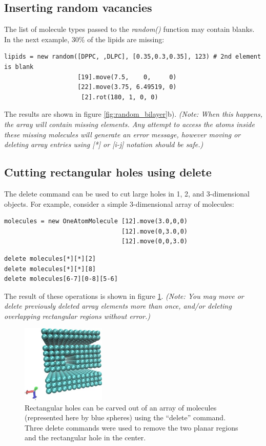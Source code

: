 \documentclass[11pt]{article}
\begin{document}
\subsection{Inserting random vacancies}
\label{sec:random_vacancies}
The list of molecule types passed to the \mbox{\textit{random()}} function
may contain blanks.  In the next example, 30\% of the lipids are missing:
\begin{verbatim}
lipids = new random([DPPC, ,DLPC], [0.35,0.3,0.35], 123) # 2nd element is blank
                    [19].move(7.5,    0,     0)
                    [22].move(3.75, 6.49519, 0)
                     [2].rot(180, 1, 0, 0)     
\end{verbatim}
The results are shown in figure \ref{fig:random_bilayer}b).
\textit{(Note: When this happens, the array will contain missing elements.
 Any attempt to access the atoms inside these missing molecules will
 generate an error message, 
 however moving or deleting array entries 
 using [*] or [i-j] notation should be safe.)}

\subsection{Cutting rectangular holes using \textbf{delete}}
\label{sec:delete_holes}
The delete command can be used to cut large holes in 
1, 2, and 3-dimensional objects.
For example, consider a simple 3-dimensional array of molecules:
\begin{verbatim}
molecules = new OneAtomMolecule [12].move(3.0,0,0)
                                [12].move(0,3.0,0)
                                [12].move(0,0,3.0)
\end{verbatim}
\begin{verbatim}
delete molecules[*][*][2]      
delete molecules[*][*][8]      
delete molecules[6-7][0-8][5-6]
\end{verbatim}
The result of these operations is shown in figure
\ref{fig:delete_holes}.
\textit{(Note: You may move or delete previously deleted array elements
         more than once, and/or deleting overlapping rectangular regions
         without error.)}

\begin{figure}[htbp]
\centering
\includegraphics[width=4.0cm]{delete_holes1.jpg}
\caption{
\label{fig:delete_holes}
Rectangular holes can be carved out of an array of molecules
(represented here by blue spheres)
using the ``delete'' command.  Three delete commands were used to
remove the two planar regions and the rectangular hole in the center.
}
\end{figure}
\end{document}
